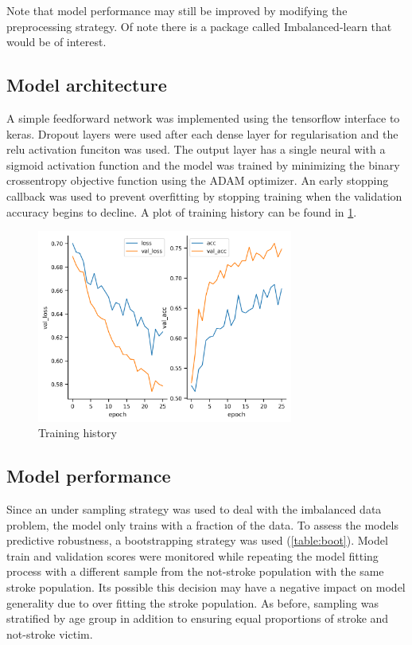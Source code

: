\documentclass[12pt]{article}
\begin{document}
    Note that model performance may still be improved by modifying the preprocessing strategy. Of note there is a
    package called Imbalanced-learn that would be of interest.

    \subsection{Model architecture}
    A simple feedforward network was implemented using the tensorflow interface to keras. Dropout layers were used
    after each dense layer for regularisation and the relu activation funciton was used. The output layer has a single
    neural with a sigmoid activation function and the model was trained by minimizing the binary crossentropy objective
    function using the ADAM optimizer. An early stopping callback was used to prevent overfitting by stopping training
    when the validation accuracy begins to decline. A plot of training history can be found in \cref{fig:training_history}.

    \begin{figure}
        \includegraphics[width=0.75\textwidth]{../data/Plots/history.png}
        \caption{Training history}
        \label{fig:training_history}
    \end{figure}

    \subsection{Model performance}
    Since an under sampling strategy was used to deal with the imbalanced data problem, the model only trains
    with a fraction of the data. To assess the models predictive robustness, a bootstrapping strategy was used (\cref{table:boot}).
    Model train and validation scores were monitored while repeating the model fitting process with a different sample
    from the not-stroke population with the same stroke population. Its possible this decision may have a negative impact
    on model generality due to over fitting the stroke population. As before, sampling was stratified by age group in
    addition to ensuring equal proportions of stroke and not-stroke victim.
\end{document}
